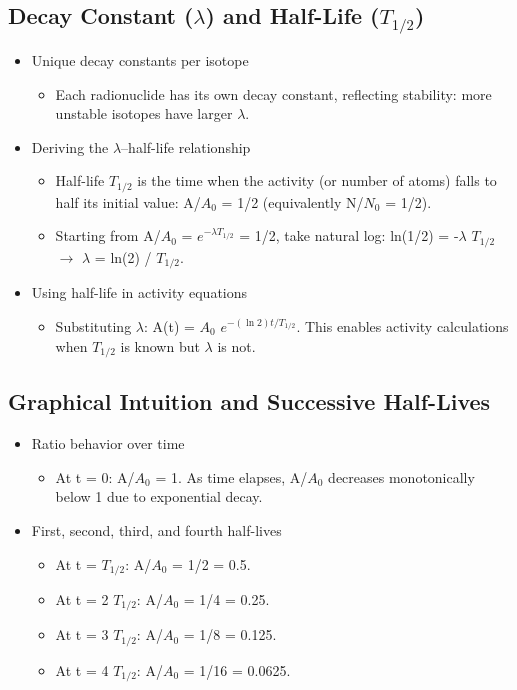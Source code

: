 \documentclass[11pt,a4paper]{article}
\let\originalsubsection\subsection
\renewcommand{\subsection}{\Needspace{8\baselineskip}\originalsubsection}
\begin{document}
\subsection{Decay Constant (\ensuremath{\lambda}) and Half-Life (\(T_{1/2}\))}
\begin{itemize}
\item Unique decay constants per isotope
\begin{itemize}
\item Each radionuclide has its own decay constant, reflecting stability: more unstable isotopes have larger \ensuremath{\lambda}.
\end{itemize}
\item Deriving the \ensuremath{\lambda}--half-life relationship
\begin{itemize}
\item Half-life \(T_{1/2}\) is the time when the activity (or number of atoms) falls to half its initial value: A/\(A_0\) = 1/2 (equivalently N/\(N_0\) = 1/2).
\item Starting from A/\(A_0\) = \(e^{-\lambda T_{1/2}}\) = 1/2, take natural log: ln(1/2) = -\ensuremath{\lambda} \(T_{1/2}\) \ensuremath{\rightarrow} \ensuremath{\lambda} = ln(2) / \(T_{1/2}\).
\end{itemize}
\item Using half-life in activity equations
\begin{itemize}
\item Substituting \ensuremath{\lambda}: A(t) = \(A_0\) \(e^{-(\ln 2)t/T_{1/2}}\). This enables activity calculations when \(T_{1/2}\) is known but \ensuremath{\lambda} is not.
\end{itemize}
\end{itemize}
\subsection{Graphical Intuition and Successive Half-Lives}
\begin{itemize}
\item Ratio behavior over time
\begin{itemize}
\item At t = 0: A/\(A_0\) = 1. As time elapses, A/\(A_0\) decreases monotonically below 1 due to exponential decay.
\end{itemize}
\item First, second, third, and fourth half-lives
\begin{itemize}
\item At t = \(T_{1/2}\): A/\(A_0\) = 1/2 = 0.5.
\item At t = 2 \(T_{1/2}\): A/\(A_0\) = 1/4 = 0.25.
\item At t = 3 \(T_{1/2}\): A/\(A_0\) = 1/8 = 0.125.
\item At t = 4 \(T_{1/2}\): A/\(A_0\) = 1/16 = 0.0625.
\end{itemize}
\end{itemize}
\end{document}
